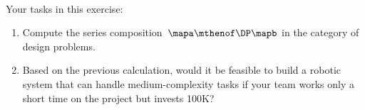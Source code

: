 \begin{gradedexercise}
    \

    Your tasks in this exercise:
    \begin{enumerate}
        \item Compute the series composition~$\mapa \mthenof\DP \mapb$ in the category of design problems.
        \item Based on the previous calculation, would it be feasible to build a robotic system that can handle medium-complexity tasks if your team works only a short time on the project but invests 100K?
    \end{enumerate}
\end{gradedexercise}

